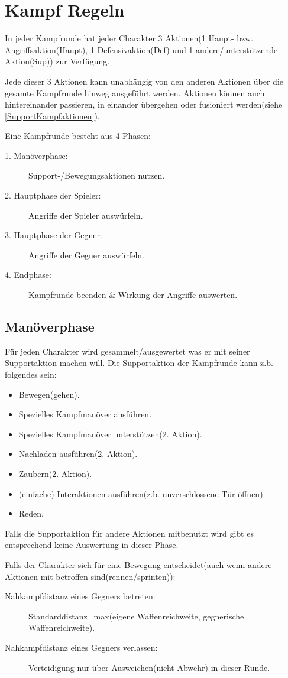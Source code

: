 \chapter{Kampf Regeln}
In jeder Kampfrunde hat jeder Charakter 3 Aktionen(1 Haupt- bzw. Angriffsaktion(Haupt), 1 Defensivaktion(Def) und 1 andere/unterstützende Aktion(Sup)) zur Verfügung.

Jede dieser 3 Aktionen kann unabhängig von den anderen Aktionen über die gesamte Kampfrunde hinweg ausgeführt werden. Aktionen können auch hintereinander passieren, in einander übergehen oder fusioniert werden(siehe \ref{SupportKampfaktionen}).

Eine Kampfrunde besteht aus 4 Phasen:
\begin{description}
\item[1. Manöverphase:] Support-/Bewegungsaktionen nutzen.
\item[2. Hauptphase der Spieler:] Angriffe der Spieler auswürfeln.
\item[3. Hauptphase der Gegner:] Angriffe der Gegner auswürfeln.
\item[4. Endphase:] Kampfrunde beenden \& Wirkung der Angriffe auswerten.
\end{description}
\section{Manöverphase}
Für jeden Charakter wird gesammelt/ausgewertet was er mit seiner Supportaktion machen will.
Die Supportaktion der Kampfrunde kann z.b. folgendes sein:
\begin{itemize}
\item Bewegen(gehen).
\item Spezielles Kampfmanöver ausführen.
\item Spezielles Kampfmanöver unterstützen(2. Aktion).
\item Nachladen ausführen(2. Aktion).
\item Zaubern(2. Aktion).
\item (einfache) Interaktionen ausführen(z.b. unverschlossene Tür öffnen).
\item Reden.
\end{itemize}
Falls die Supportaktion für andere Aktionen mitbenutzt wird gibt es entsprechend keine Auswertung in dieser Phase.

Falls der Charakter sich für eine Bewegung entscheidet(auch wenn andere Aktionen mit betroffen sind(rennen/sprinten)):
\begin{description}
\item[Nahkampfdistanz eines Gegners betreten:] Standarddistanz=max(eigene Waffenreichweite, gegnerische Waffenreichweite).
\item[Nahkampfdistanz eines Gegners verlassen:] Verteidigung nur über Ausweichen(nicht Abwehr) in dieser Runde.
\end{description}

